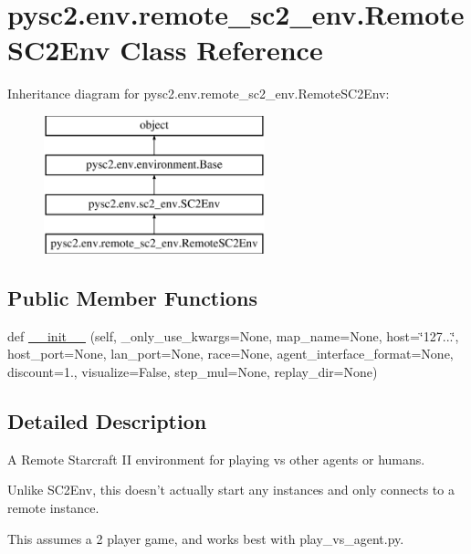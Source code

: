 \hypertarget{classpysc2_1_1env_1_1remote__sc2__env_1_1_remote_s_c2_env}{}\section{pysc2.\+env.\+remote\+\_\+sc2\+\_\+env.\+Remote\+S\+C2\+Env Class Reference}
\label{classpysc2_1_1env_1_1remote__sc2__env_1_1_remote_s_c2_env}
Inheritance diagram for pysc2.\+env.\+remote\+\_\+sc2\+\_\+env.\+Remote\+S\+C2\+Env\+:\begin{figure}[H]
\begin{center}
\leavevmode
\includegraphics[height=4.000000cm]{classpysc2_1_1env_1_1remote__sc2__env_1_1_remote_s_c2_env}
\end{center}
\end{figure}
\subsection*{Public Member Functions}
\begin{DoxyCompactItemize}
\item 
def \mbox{\hyperlink{classpysc2_1_1env_1_1remote__sc2__env_1_1_remote_s_c2_env_a24badc19f47472b86e579ded70a36b97}{\+\_\+\+\_\+init\+\_\+\+\_\+}} (self, \+\_\+only\+\_\+use\+\_\+kwargs=None, map\+\_\+name=None, host=\char`\"{}127...\char`\"{}, host\+\_\+port=None, lan\+\_\+port=None, race=None, agent\+\_\+interface\+\_\+format=None, discount=1., visualize=False, step\+\_\+mul=None, replay\+\_\+dir=None)
\end{DoxyCompactItemize}


\subsection{Detailed Description}
\begin{DoxyVerb}A Remote Starcraft II environment for playing vs other agents or humans.

Unlike SC2Env, this doesn't actually start any instances and only connects
to a remote instance.

This assumes a 2 player game, and works best with play_vs_agent.py.
\end{DoxyVerb}
 

